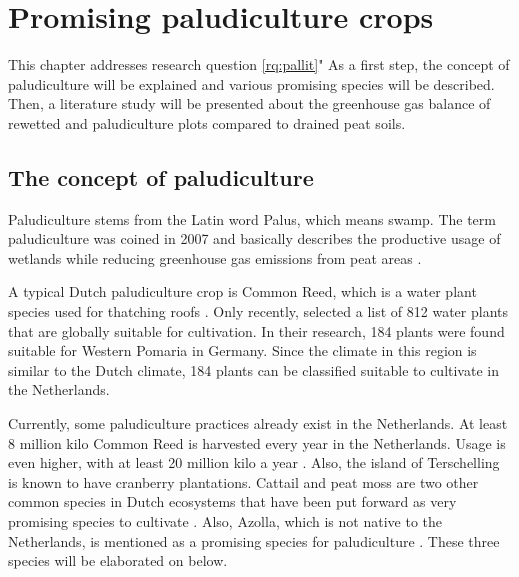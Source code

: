 {\chapter{Promising paludiculture crops} \label{ch:abiotmarket}

This chapter addresses research question \ref{rq:pallit}" As a first step, the concept of paludiculture will be explained and various promising species will be described. Then, a literature study will be presented about the greenhouse gas balance of rewetted and paludiculture plots compared to drained peat soils.

\section{The concept of paludiculture}

Paludiculture stems from the Latin word Palus, which means swamp. The term paludiculture was coined in 2007 and basically describes the productive usage of wetlands while reducing greenhouse gas emissions from peat areas \citep{wichtmann2007paludiculture}. 

A typical Dutch paludiculture crop is Common Reed, which is a water plant species used for thatching roofs \citep{wichtmann2016paludiculture}. Only recently, \citet{abel2013database} selected a list of 812 water plants that are globally suitable for cultivation. In their research, 184 plants were found suitable for Western Pomaria in Germany. Since the climate in this region is similar to the Dutch climate, 184 plants can be classified suitable to cultivate in the Netherlands. 

Currently, some paludiculture practices already exist in the Netherlands. At least 8 million kilo Common Reed is harvested every year in the Netherlands. Usage is even higher, with at least 20 million kilo a year \citep{wichtmann2016paludiculture}. Also, the island of Terschelling is known to have cranberry plantations. Cattail and peat moss are two other common species in Dutch ecosystems that have been put forward as very promising species to cultivate \citep{abel2013database, van2013werk}. Also, Azolla, which is not native to the Netherlands, is mentioned as a promising species for paludiculture \citep{abel2013database, van2013werk}. 
These three species will be elaborated on below.

}
